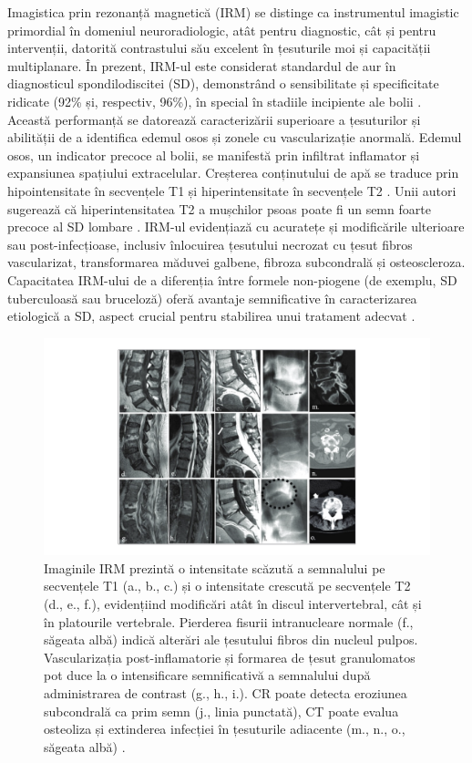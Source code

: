 \message{ !name(LaMain.tex)}\documentclass[romanian,12pt,a4paper]{article}
\begin{document}
Imagistica prin rezonanță magnetică (IRM) se distinge ca instrumentul
imagistic primordial în domeniul neuroradiologic, atât pentru
diagnostic, cât și pentru intervenții, datorită contrastului său
excelent în țesuturile moi și capacității multiplanare. În prezent,
IRM-ul este considerat standardul de aur în diagnosticul
spondilodiscitei (SD), demonstrând o sensibilitate și specificitate
ridicate (92\% și, respectiv, 96\%), în special în stadiile incipiente
ale bolii
\cite{SpondylodiscitisDiagnosisTreatment2017}\cite{CurrentDiagnosisTreatment2008}
. Această performanță se datorează caracterizării superioare a
țesuturilor și abilității de a identifica edemul osos și zonele cu
vascularizație anormală. Edemul osos, un indicator precoce al bolii, se
manifestă prin infiltrat inflamator și expansiunea spațiului
extracelular. Creșterea conținutului de apă se traduce prin
hipointensitate în secvențele T1 și hiperintensitate în secvențele T2
\cite{SpinalInfectionState2013}. Unii autori sugerează că
hiperintensitatea T2 a mușchilor psoas poate fi un semn foarte precoce
al SD lombare \cite{ImagingPsoasSign2016}. IRM-ul evidențiază cu
acuratețe și modificările ulterioare sau post-infecțioase, inclusiv
înlocuirea țesutului necrozat cu țesut fibros vascularizat,
transformarea măduvei galbene, fibroza subcondrală și osteoscleroza.
Capacitatea IRM-ului de a diferenția între formele non-piogene (de
exemplu, SD tuberculoasă sau bruceloză) oferă avantaje semnificative în
caracterizarea etiologică a SD, aspect crucial pentru stabilirea unui
tratament adecvat
\cite{SpinalInfectionState2013}\cite{DiagnosticInterventionalManagement2020}.

\begin{figure}
\centering
\includegraphics[width=\textwidth]{Files/IRM-important.png}
\caption{Imaginile IRM prezintă o intensitate scăzută a semnalului pe
secvențele T1 (a., b., c.) și o intensitate crescută pe secvențele T2
(d., e., f.), evidențiind modificări atât în discul intervertebral, cât
și în platourile vertebrale. Pierderea fisurii intranucleare normale
(f., săgeata albă) indică alterări ale țesutului fibros din nucleul
pulpos. Vascularizația post-inflamatorie și formarea de țesut
granulomatos pot duce la o intensificare semnificativă a semnalului după
administrarea de contrast (g., h., i.). CR poate detecta eroziunea
subcondrală ca prim semn (j., linia punctată), CT poate evalua osteoliza
și extinderea infecției în țesuturile adiacente (m., n., o., săgeata
albă)
\cite{DiagnosticInterventionalManagement2020}.}\label{IRM-important}
\end{figure}
\end{document}
